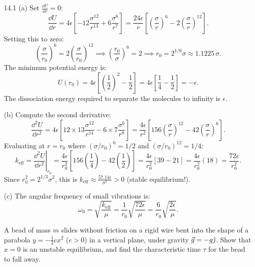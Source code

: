 \begin{solution}{14.1}
(a) Set $\frac{\dd U}{\dd r} = 0$:
\[
\frac{\dd U}{\dd r} = 4\epsilon\left[ -12\frac{\sigma^{12}}{r^{13}} + 6\frac{\sigma^6}{r^7} \right] = \frac{24\epsilon}{r}\left[ \left(\frac{\sigma}{r}\right)^6 - 2\left(\frac{\sigma}{r}\right)^{12} \right].
\]
Setting this to zero:
\[
\left(\frac{\sigma}{r_0}\right)^6 = 2\left(\frac{\sigma}{r_0}\right)^{12} \implies \left(\frac{r_0}{\sigma}\right)^6 = 2 \implies \boxed{r_0 = 2^{1/6}\sigma \approx 1.1225\,\sigma.}
\]
The minimum potential energy is:
\[
U(r_0) = 4\epsilon\left[ \left(\frac{1}{2}\right)^2 - \frac{1}{2} \right] = 4\epsilon\left[ \frac{1}{4} - \frac{1}{2} \right] = \boxed{-\epsilon.}
\]
The dissociation energy required to separate the molecules to infinity is $\epsilon$.

(b) Compute the second derivative:
\[
\frac{\dd^2 U}{\dd r^2} = 4\epsilon\left[ 12\times 13\frac{\sigma^{12}}{r^{14}} - 6\times 7\frac{\sigma^6}{r^8} \right] = \frac{4\epsilon}{r^2}\left[ 156\left(\frac{\sigma}{r}\right)^{12} - 42\left(\frac{\sigma}{r}\right)^6 \right].
\]
Evaluating at $r = r_0$ where $(\sigma/r_0)^6 = 1/2$ and $(\sigma/r_0)^{12} = 1/4$:
\[
k_{\text{eff}} = \left.\frac{\dd^2 U}{\dd r^2}\right|_{r_0} = \frac{4\epsilon}{r_0^2}\left[ 156\left(\frac{1}{4}\right) - 42\left(\frac{1}{2}\right) \right] = \frac{4\epsilon}{r_0^2}\left[ 39 - 21 \right] = \frac{4\epsilon}{r_0^2}(18) = \boxed{\frac{72\epsilon}{r_0^2}.}
\]
Since $r_0^2 = 2^{1/3}\sigma^2$, this is $k_{\text{eff}} \approx \frac{57.14\epsilon}{\sigma^2} > 0$ (stable equilibrium!).

(c) The angular frequency of small vibrations is:
\[
\boxed{\omega_0 = \sqrt{\frac{k_{\text{eff}}}{\mu}} = \frac{1}{r_0}\sqrt{\frac{72\epsilon}{\mu}} = \frac{6}{r_0}\sqrt{\frac{2\epsilon}{\mu}}.}
\]
\end{solution}

\begin{worked}
A bead of mass $m$ slides without friction on a rigid wire bent into the shape of a parabola $y = -\frac{1}{2}c x^2$ ($c > 0$) in a vertical plane, under gravity $\vec{g} = -g\hat{\jmath}$.
Show that $x = 0$ is an unstable equilibrium, and find the characteristic time $\tau$ for the bead to fall away.
\end{worked}


